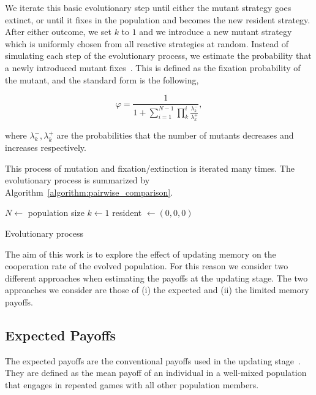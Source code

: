 \documentclass[11pt]{article}
\theoremstyle{plainCl1}
\theoremstyle{plainCl2}
\begin{document}
We iterate this basic evolutionary step until either the mutant strategy goes
extinct, or until it fixes in the population and becomes the new resident
strategy. After either outcome, we set $k$ to $1$ and we introduce a new mutant
strategy which is uniformly chosen from all reactive strategies at random.
Instead of simulating each step of the evolutionary process, we estimate the
probability that a newly introduced mutant fixes~\cite{nowak2004emergence}. This
is defined as the fixation probability of the mutant, and the standard form is
the following,

\begin{equation}\label{eq:appendix_fixation_probability}
\varphi = \frac{1}{1+\sum\limits_{i=1}^{N-1}\prod\limits_k^i \frac{\lambda^-_k}{\lambda^+_k}},
\end{equation}

where \(\lambda^-_k, \lambda^+_k\) are the probabilities that the number of
mutants decreases and increases respectively.

This process of mutation and fixation/extinction is iterated many times. The
evolutionary process is summarized by
Algorithm~\ref{algorithm:pairwise_comparison}.

\begin{algorithm}[!htbp]
  \SetAlgoLined
   $N \leftarrow$ population size\;
   $k \leftarrow 1$\;
   resident $\leftarrow (0, 0, 0)$\;
     \caption{Evolutionary process}\label{algorithm:pairwise_comparison}
\end{algorithm}

The aim of this work is to explore the effect of updating memory on the
cooperation rate of the evolved population. For this reason we consider two
different approaches when estimating the payoffs at the updating stage. The two
approaches we consider are those of (i) the expected and (ii) the limited memory
payoffs.

\subsection*{Expected Payoffs}

The expected payoffs are the conventional payoffs used in the updating
stage~\cite{imhof2010stochastic}. They are defined as the mean payoff of an
individual in a well-mixed population that engages in repeated games with all
other population members.
\end{document}
